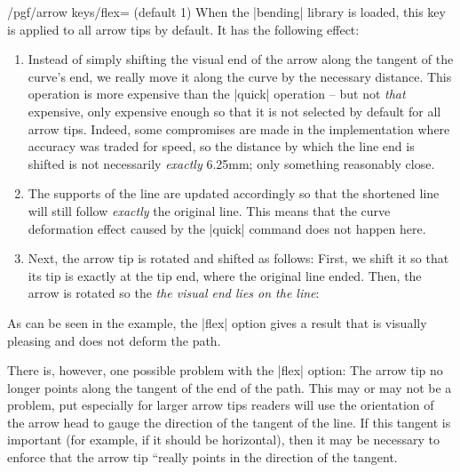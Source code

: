 \begin{key}{/pgf/arrow keys/flex= (default 1)}
  When the |bending| library is loaded, this key is applied 
  to all arrow tips by default. It has the following effect:
  \begin{enumerate}
  \item Instead of simply shifting the visual end of the arrow along
    the tangent of the curve's end, we really move it along the curve
    by the necessary distance. This operation is more expensive than
    the |quick| operation -- but not \emph{that} expensive, only
    expensive enough so that it is not selected by default for all
    arrow tips. Indeed, some compromises are made in the
    implementation where accuracy was traded for speed, so the
    distance by which the line end is shifted is not necessarily
    \emph{exactly} 6.25mm; only something reasonably close.
  \item The supports of the line are updated accordingly so that the
    shortened line will still follow \emph{exactly} the original
    line. This means that the curve deformation effect caused by the
    |quick| command does not happen here.
  \item Next, the arrow tip is rotated and shifted as follows: First,
    we shift it so that its tip is exactly at the tip end, where the
    original line ended. Then, the arrow is rotated so the \emph{the
      visual end lies on the line}:
\begin{codeexample}[]
\end{codeexample}
  \end{enumerate}

  As can be seen in the example, the |flex| option gives a result that
  is visually pleasing and does not deform the path.
  
  There is, however, one possible problem with the |flex| option: The
  arrow tip no longer points along the tangent of the end of the
  path. This may or may not be a problem, put especially for larger
  arrow tips readers will use the orientation of the arrow head to
  gauge the direction of the tangent of the line. If this tangent is
  important (for example, if it should be horizontal), then it may be
  necessary to enforce that the arrow tip ``really points in the
  direction of the tangent.


\end{key}
